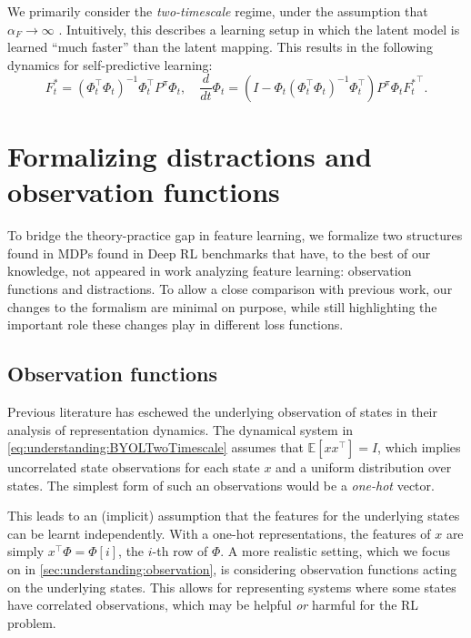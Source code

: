 We primarily consider the \emph{two-timescale} regime, under the assumption that $\alpha_F\to \infty$ \parencite{tang2022understanding}. Intuitively, this describes a learning setup in which the latent model is learned ``much faster'' than the latent mapping. 
This results in the following dynamics for self-predictive learning:
\begin{equation}
    \label{eq:understanding:BYOLTwoTimescale}
    F_t^* = \left(\Phi_t^\top\Phi_t\right)^{-1} \Phi_t^\top P^\pi \Phi_t, \quad \frac{d}{dt}\Phi_t = \left(I-\Phi_t\left(\Phi_t^\top \Phi_t\right)^{-1}\Phi_t^\top\right)P^\pi \Phi_t {F_t^*}^\top.
\end{equation}

\section{Formalizing distractions and observation functions}
\label{sec:understanding:formalism}
To bridge the theory-practice gap in feature learning, we formalize two structures found in MDPs found in Deep RL benchmarks that have, to the best of our knowledge, not appeared in work analyzing feature learning: observation functions and distractions.
To allow a close comparison with previous work, our changes to the formalism are minimal on purpose, while still highlighting the important role these changes play in different loss functions.

\subsection{Observation functions}
Previous literature \parencite{tang2022understanding,tang2023towards,lelan2022generalization} has eschewed the underlying observation of states in their analysis of representation dynamics. 
The dynamical system in \autoref{eq:understanding:BYOLTwoTimescale} assumes that $\mathbb{E}[xx^\top ] = I$, which implies uncorrelated state observations for each state $x$ and a uniform distribution over states.
The simplest form of such an observations would be a \emph{one-hot} vector.

This leads to an (implicit) assumption that the features for the underlying states can be learnt independently.
With a one-hot representations, the features of $x$ are simply $x^\top \Phi = \Phi[i]$, the $i$-th row of $\Phi$.
A more realistic setting, which we focus on in \autoref{sec:understanding:observation}, is considering observation functions acting on the underlying states. 
This allows for representing systems where some states have correlated observations, which may be helpful \emph{or} harmful for the RL problem. 

